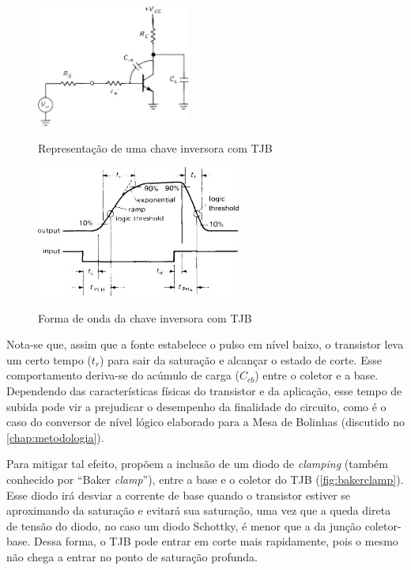 \begin{figure}[H]
    \centering
    \caption{Representação de uma chave inversora com TJB}
    \includegraphics[width=0.45\textwidth]{./dados/figuras/tjb}
    \label{fig:tjb}
\end{figure}

\begin{figure}[H]
    \centering
    \caption{Forma de onda da chave inversora com TJB}
    \includegraphics[width=0.6\textwidth]{./dados/figuras/curvatjb}
    \label{fig:curvatjb}
\end{figure}

Nota-se que, assim que a fonte estabelece o pulso em nível baixo, o transistor leva um certo tempo ($t_r$) para sair da saturação e alcançar o estado de corte. Esse comportamento deriva-se do acúmulo de carga ($C_{cb}$) entre o coletor e a base. Dependendo das características físicas do transistor e da aplicação, esse tempo de subida pode vir a prejudicar o desempenho da finalidade do circuito, como é o caso do conversor de nível lógico elaborado para a Mesa de Bolinhas (discutido no \autoref{chap:metodologia}).

Para mitigar tal efeito,  propõem a inclusão de um diodo de \emph{clamping} (também conhecido por  ``Baker \emph{clamp}''), entre a base e o coletor do TJB (\autoref{fig:bakerclamp}). Esse diodo irá desviar a corrente de base quando o transistor estiver se aproximando da saturação e evitará sua saturação, uma vez que a queda direta de tensão do diodo, no caso um diodo Schottky, é menor que a da junção coletor-base. Dessa forma, o TJB pode entrar em corte mais rapidamente, pois o mesmo não chega a entrar no ponto de saturação profunda.

